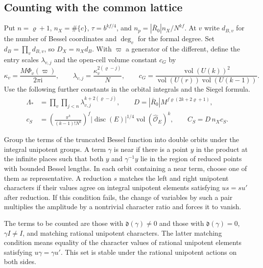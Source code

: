 \subsection{Counting with the common lattice}\label{sec:span-pair-count}

Put \(n=\varrho+1\), \(n_X=\#\{c\}\), \(\tau=b^{kf/4}\), and
\(n_p=|\bar R_0|n_X/N^{kf}\). At \(v\) write \(d_{B,v}\) for the number of
Bessel coordinates and \(\deg_v\) for the formal degree. Set
\(d_B=\prod_v d_{B,v}\), so \(D_X=n_Xd_B\).
With \(\varpi\) a generator of the different, define the entry scales
\(\lambda_{v,j}\) and the open-cell volume constant \(c_G\) by
\[
 \kappa_v=\frac{M\Phi_v(\varpi)}{2\pi\mathrm i},\qquad
 \lambda_{v,j}=\frac{\kappa_v^{2(\varrho-j)}}{N},\qquad
 c_G=\frac{\operatorname{vol}(U(k))^2}
          {\operatorname{vol}(U(r))\operatorname{vol}(U(k-1))}.
\]
Use the following further constants in the orbital integrals and the
Siegel formula.
\[
 \begin{split}
 \Lambda_\ast&=\prod_v\prod_{j<n}
                          \lambda_{v,j}^{k+2(\varrho-j)},\qquad
 D=|\bar R_0|M^{f\varrho(2k+2\varrho+1)},\\
 c_S&=\left(\frac{\pi^k}{(k-1)!N^k}\right)^f
       |\operatorname{disc}(E)|^{1/4}
       \operatorname{vol}(\widehat{\mathcal O}_E)^k,\qquad C_S=D\,n_Xc_S .
 \end{split}
\]

Group the terms of the truncated Bessel function
into double orbits under the integral unipotent groups. A term
\(\gamma\) is near if there is a point \(y\) in the product at the infinite
places such that both \(y\) and \(\gamma^{-1}y\) lie in the region of reduced
points with bounded Bessel lengths. In each orbit containing a near term,
choose one of them as representative. A reduction \(s\) matches the left and
right unipotent characters if their values agree on integral unipotent
elements satisfying \(us=su'\) after reduction. If this condition fails,
the change of variables by such a pair multiplies the amplitude by a
nontrivial character ratio and forces it to vanish.

The terms to be counted are those with \(\mathfrak d(\gamma)\ne0\) and those
with \(\mathfrak d(\gamma)=0\), \(\gamma I\ne I\), and matching rational
unipotent characters. The latter matching condition means equality of
the character values of rational unipotent elements satisfying
\(u\gamma=\gamma u'\). This set is stable under the rational unipotent
actions on both sides.

